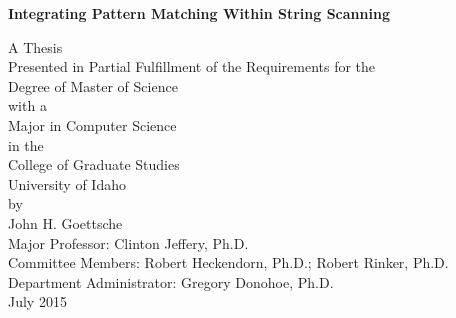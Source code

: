 \documentclass{article}
\begin{document}
\begin{titlepage}
\begin{center}
	\begin{Large}
	\textbf{Integrating Pattern Matching Within String Scanning}\\
	\end{Large}
	\begin{large}
	\vspace{5 pc}
	A Thesis\\
	Presented in Partial Fulfillment of the Requirements for the\\
	Degree of Master of Science\\
	with a\\
	Major in Computer Science\\
	in the\\
	College of Graduate Studies\\
	University of Idaho\\
	by\\John H. Goettsche\\
	\vspace{5 pc}
	Major Professor: Clinton Jeffery, Ph.D.\\
	Committee Members: Robert Heckendorn, Ph.D.; Robert Rinker, 	Ph.D.\\
	Department Administrator: Gregory Donohoe, Ph.D.\\
	\vspace{8 pc}
	July 2015
	\end{large}
	\end{center}
\end{titlepage}

	
\thispagestyle{empty}

\pagebreak
\large
\thispagestyle{fancy}

\setcounter{page}{2}
\end{document}
